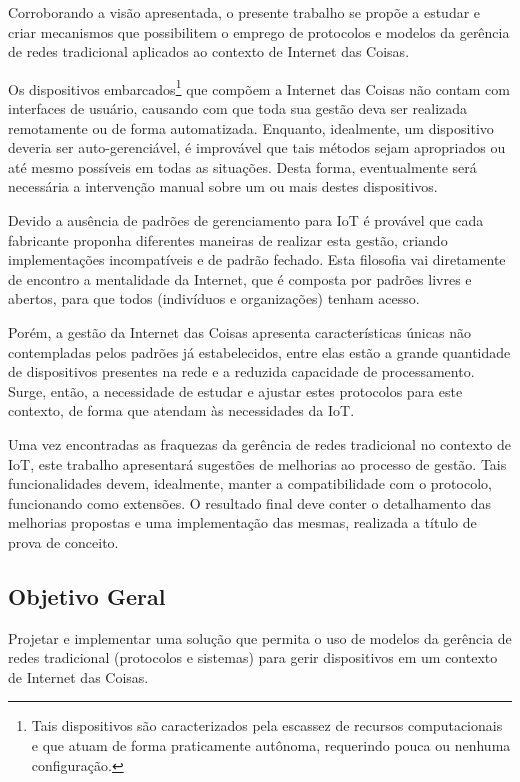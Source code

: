 \documentclass[twoside,english,brazilian]{UNISINOSmonografia}
\begin{document}
	Corroborando a visão apresentada, o presente trabalho se propõe a estudar 
	e 
	criar mecanismos que possibilitem o emprego de protocolos e modelos da 
	gerência de redes tradicional aplicados ao contexto de Internet das 
	Coisas. 
	
	Os dispositivos embarcados\footnote{
Tais dispositivos são caracterizados pela escassez de recursos computacionais 
e que atuam de forma praticamente autônoma, requerindo pouca ou nenhuma 
configuração.
	}
	que compõem a Internet das Coisas não contam 
	com interfaces de usuário, causando com que toda sua gestão deva ser 
	realizada remotamente ou de forma automatizada. Enquanto, idealmente, um 
	dispositivo deveria ser auto-gerenciável, é improvável que tais métodos 
	sejam apropriados ou até mesmo possíveis em todas as situações. Desta 
	forma, eventualmente será 
	necessária a intervenção manual sobre um ou mais destes dispositivos.

	Devido a ausência de padrões de gerenciamento para IoT é provável que cada 
	fabricante 
	proponha diferentes maneiras de realizar esta gestão, criando 
	implementações 
	incompatíveis e de padrão fechado. Esta filosofia vai diretamente 
	de encontro a mentalidade da Internet, que é composta por padrões livres e 
	abertos,
	para que todos (indivíduos e organizações) tenham acesso.

	Porém, a gestão da Internet das Coisas apresenta características únicas 
	não contempladas pelos padrões já estabelecidos, entre elas estão a grande 
	quantidade de dispositivos presentes na rede e a reduzida capacidade de 
	processamento. Surge, então, a necessidade de estudar e ajustar estes 
	protocolos para este contexto, de forma que atendam às necessidades da IoT.

	Uma vez encontradas as fraquezas da gerência de redes tradicional no 
	contexto de IoT, este trabalho apresentará sugestões de melhorias ao 
	processo de gestão.
	Tais funcionalidades devem, idealmente, manter a compatibilidade com o 
	protocolo, funcionando como extensões. 
	O resultado final deve conter o detalhamento das melhorias propostas e uma 
	implementação das mesmas, realizada a título de prova de conceito.

\subsection{Objetivo Geral}

Projetar e implementar uma solução que permita o uso de modelos da gerência de 
redes tradicional (protocolos e sistemas) para gerir dispositivos em um 
contexto de Internet das Coisas.
\end{document}
